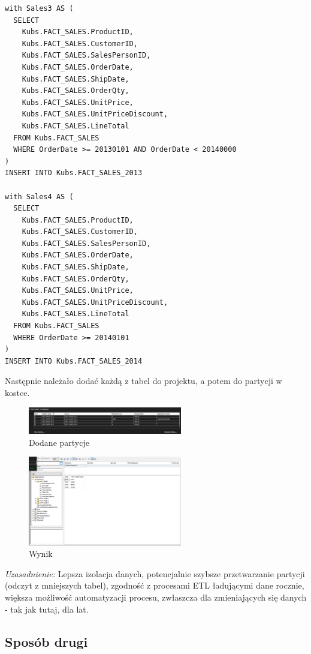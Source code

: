 \documentclass[a4paper,12pt]{article}
\begin{document}
\begin{lstlisting}[caption={Tworzenie i wypełnianie tabeli DIM\_TIME.}]
with Sales3 AS (
  SELECT 
    Kubs.FACT_SALES.ProductID,
    Kubs.FACT_SALES.CustomerID,
    Kubs.FACT_SALES.SalesPersonID,
    Kubs.FACT_SALES.OrderDate,
    Kubs.FACT_SALES.ShipDate,
    Kubs.FACT_SALES.OrderQty,
    Kubs.FACT_SALES.UnitPrice,
    Kubs.FACT_SALES.UnitPriceDiscount,
    Kubs.FACT_SALES.LineTotal
  FROM Kubs.FACT_SALES
  WHERE OrderDate >= 20130101 AND OrderDate < 20140000
)
INSERT INTO Kubs.FACT_SALES_2013

with Sales4 AS (
  SELECT 
    Kubs.FACT_SALES.ProductID,
    Kubs.FACT_SALES.CustomerID,
    Kubs.FACT_SALES.SalesPersonID,
    Kubs.FACT_SALES.OrderDate,
    Kubs.FACT_SALES.ShipDate,
    Kubs.FACT_SALES.OrderQty,
    Kubs.FACT_SALES.UnitPrice,
    Kubs.FACT_SALES.UnitPriceDiscount,
    Kubs.FACT_SALES.LineTotal
  FROM Kubs.FACT_SALES
  WHERE OrderDate >= 20140101
)
INSERT INTO Kubs.FACT_SALES_2014
\end{lstlisting}

Następnie należało dodać każdą z tabel do projektu, a potem do partycji w kostce.

\begin{figure}[H]
  \centering
  \includegraphics[width=0.6\textwidth]{4a.png}
  \caption{Dodane partycje}
\end{figure}

\begin{figure}[H]
  \centering
  \includegraphics[width=0.6\textwidth]{4a_result.png}
  \caption{Wynik}
\end{figure}

\textit{Uzasadnienie:} Lepsza izolacja danych, potencjalnie szybsze przetwarzanie partycji (odczyt z mniejszych tabel), zgodność z procesami ETL ładującymi dane rocznie, większa możliwość automatyzacji procesu, zwłaszcza dla zmieniających się danych - tak jak tutaj, dla lat.

\subsection{Sposób drugi}
\end{document}
